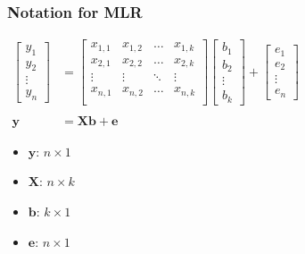 \begin{frame}\frametitle{Notation for MLR}
	
	$ 
	\begin{array}{rl}
		\begin{bmatrix}
			y_1\\
			y_2\\
			\vdots \\
			y_n 
		\end{bmatrix}
		&= 
		\begin{bmatrix}
			x_{1,1} & x_{1,2} & \ldots & x_{1,k}\\
			x_{2,1} & x_{2,2} & \ldots & x_{2,k}\\
			\vdots & \vdots & \ddots & \vdots\\
			x_{n,1} & x_{n,2} & \ldots & x_{n,k}\\
		\end{bmatrix}
		\begin{bmatrix}
			b_1 \\
			b_2 \\
			\vdots \\
			b_k 
		\end{bmatrix}
		+ 
		\begin{bmatrix}
			e_1\\
			e_2\\
			\vdots \\
			e_n 
		\end{bmatrix}
		\\
		& \\
		\mathbf{y} &= \mathbf{X} \mathbf{b} + \mathbf{e} 
	\end{array}
	$
	\begin{itemize}
		\item	$\mathbf{y}$: $n \times 1$ 
		\item	$\mathbf{X}$: $n \times k$ 
		\item	$\mathbf{b}$: $k \times 1$ 
		\item	$\mathbf{e}$: $n \times 1$ 
	\end{itemize}
\end{frame}

